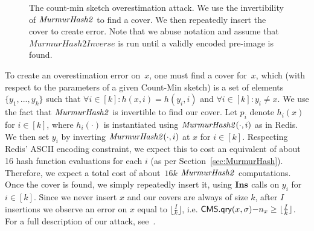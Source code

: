 \begin{figure}[htp] 
    \centering
    \begin{pcvstack}
    \end{pcvstack}
    \caption[Redis CMS Overestimation Attack.]{The count-min sketch overestimation attack. We use the invertibility of $\mathit{MurmurHash2}$ to find a cover. We then repeatedly insert the cover to create error. Note that we abuse notation and assume that~$\mathit{MurmurHash2Inverse}$ is run until a validly encoded pre-image is found.} 
	\label{fig:cms-attack}
\end{figure}

To create an overestimation error on~$x$, one must find a cover for~$x$, which (with respect to the parameters of a given Count-Min sketch) is a set of elements~$\{ y_1{,}...{,}y_k\}$ such that ${\forall} i {\in} [k] {:} h(x,i) {=} h(y_i,i)$ and $\forall i {\in} [k] {:} y_i {\neq} x$. We use the fact that $\mathit{MurmurHash2}$ is invertible to find our cover. Let $p_i$ denote $h_i(x)$ for $i \in [k]$, where $h_i(\cdot)$ is instantiated using $\mathit{MurmurHash2}(\cdot,i)$ as in Redis. We then set $y_i$ by inverting $\mathit{MurmurHash2}(\cdot,i)$ at $x$ for $i \in [k]$. Respecting Redis' ASCII encoding constraint, we expect this to cost an equivalent of about 16 hash function evaluations for each $i$ (as per Section~\ref{sec:MurmurHash}). Therefore, we expect a total cost of about~$16 k$ $\mathit{MurmurHash2}$ computations. Once the cover is found, we simply repeatedly insert it, using $\textbf{Ins}$ calls on $y_i$ for $i \in [k]$. Since we never insert $x$ and our covers are always of size $k$, after $I$ insertions we observe an error on $x$ equal to $\lfloor \frac{I}{k}  \rfloor$, i.e. $\textsf{CMS}.\textsf{qry}(x, \sigma) {-} n_x \geq \lfloor \frac{I}{k} \rfloor$. For a full description of our attack, see~.

